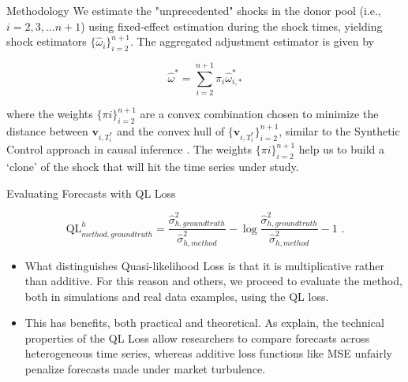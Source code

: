 \documentclass{beamer} %
\newcommand{\x}{\textbf{v}}
\begin{document}
\begin{frame}[t]
\begin{columns}[t]
\begin{column}{0.465\textwidth}
\begin{block}{Methodology}
We estimate the "unprecedented" shocks in the donor pool (i.e., $i = 2,3,...n+1$) using fixed-effect estimation during the shock times, yielding shock estimators $\{\hat\omega_{i}\}_{i=2}^{n+1}$.  The aggregated adjustment estimator is given by

\begin{equation}
	\hat\omega^{*} = \sum^{n+1}_{i=2}\pi_{i}\hat\omega^{*}_{i,*}
\end{equation}

where the weights $\{\pi{i}\}_{i=2}^{n+1}$ are a convex combination chosen to minimize the distance between $\x_{i,T^{*}_{i}}$ and the convex hull of $\{\x_{i,T^{*}_{i}}\}^{n+1}_{i=2}$, similar to the Synthetic Control approach in causal inference \cite{abadie2003economic,abadie2010synthetic}.  The weights $\{\pi{i}\}_{i=2}^{n+1}$ help us to build a `clone' of the shock that will hit the time series under study.

\end{block}


\begin{block}{Evaluating Forecasts with QL Loss}
	
\begin{equation}
\text{QL}^{h}_{method, ground truth} = \frac{\hat\sigma^{2}_{h, ground truth}}{ \hat\sigma^{2}_{h, method}} - \log{\frac{\hat\sigma^{2}_{h, ground truth}}{ \hat\sigma^{2}_{h, method}}} -1 \text{ .}
\end{equation}




	\begin{itemize}
		\item What distinguishes Quasi-likelihood Loss is that it is multiplicative rather than additive.  For this reason and others, we proceed to evaluate the method, both in simulations and real data examples, using the QL loss.
		\item This has benefits, both practical and theoretical.  As \cite{brownlees2011practical} explain, the technical properties of the QL Loss allow researchers to compare forecasts across heterogeneous time series, whereas additive loss functions like MSE unfairly penalize forecasts made under market turbulence.  
	\end{itemize}
\end{block}


\end{column}
\end{columns}
\end{frame}
\end{document}
